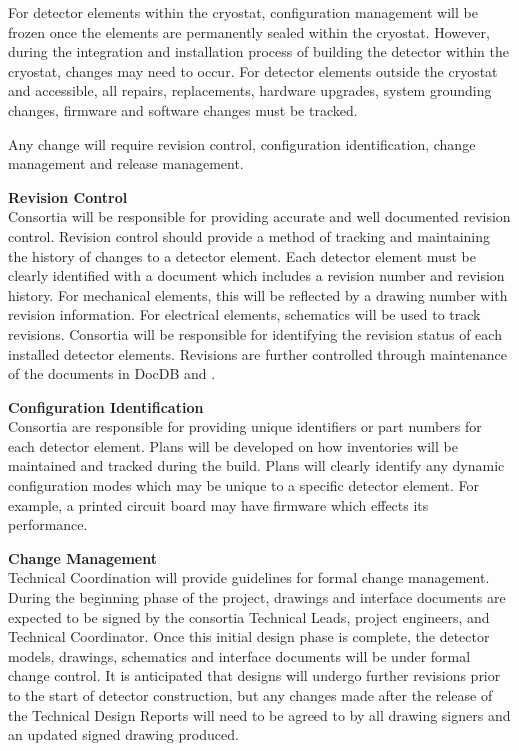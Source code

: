 For detector elements within the cryostat, configuration management
will be frozen once the elements are permanently sealed within the
cryostat.  However, during the integration and installation process of
building the detector within the cryostat, changes may need to occur.
For detector elements outside the cryostat and accessible, all
repairs, replacements, hardware upgrades, system grounding changes,
firmware and software changes must be tracked.

Any change will require revision control, configuration
identification, change management and release management.

{\bf Revision Control}\\ Consortia will be responsible for providing
accurate and well documented revision control.  Revision control
should provide a method of tracking and maintaining the history of
changes to a detector element.  Each detector element must be clearly
identified with a document which includes a revision number and
revision history.  For mechanical elements, this will be reflected by
a drawing number with revision information.  For electrical elements,
schematics will be used to track revisions.  Consortia will be
responsible for identifying the revision status of each installed
detector elements. Revisions are further controlled through maintenance
of the documents in DocDB and .

{\bf Configuration Identification}\\
Consortia are responsible for providing unique identifiers or part
numbers for each detector element.  Plans will be developed on how
inventories will be maintained and tracked during the build.  Plans
will clearly identify any dynamic configuration modes which may be
unique to a specific detector element.  For example, a printed circuit
board may have firmware which effects its performance.

{\bf Change Management}\\
Technical Coordination will provide guidelines
for formal change management.  During the beginning phase of the
project, drawings and interface documents are expected to be signed by
the consortia Technical Leads, project engineers, and Technical
Coordinator.  Once this initial design phase is complete, the detector
models, drawings, schematics and interface documents will be under
formal change control.  It is anticipated that designs will undergo
further revisions prior to the start of detector construction, but any
changes made after the release of the Technical Design Reports will
need to be agreed to by all drawing signers and an updated signed
drawing produced.

